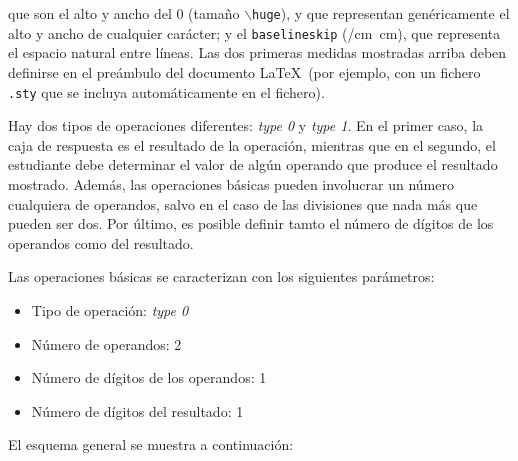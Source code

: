 \documentclass[svgnames,addpoints]{exam}
\makeatletter
\def\convertto#1#2{\strip@pt\dimexpr #2*65536/\number\dimexpr 1#1}
\makeatother
\begin{document}
\noindent
que son el alto y ancho del {\huge 0} (tamaño \texttt{$\backslash$huge}), y que
representan genéricamente el alto y ancho de cualquier carácter; y el
\texttt{baselineskip} (\convertto{cm}{\the\baselineskip}\ cm), que representa el
espacio natural entre líneas. Las dos primeras medidas mostradas arriba deben
definirse en el preámbulo del documento \LaTeX\ (por ejemplo, con un fichero
\texttt{.sty} que se incluya automáticamente en el fichero).

Hay dos tipos de operaciones diferentes: \textit{type 0} y \textit{type 1}. En
el primer caso, la caja de respuesta es el resultado de la operación, mientras
que en el segundo, el estudiante debe determinar el valor de algún operando que
produce el resultado mostrado. Además, las operaciones básicas pueden involucrar
un número cualquiera de operandos, salvo en el caso de las divisiones que nada
más que pueden ser dos. Por último, es posible definir tamto el número de
dígitos de los operandos como del resultado.

Las operaciones básicas se caracterizan con los siguientes parámetros:

\begin{itemize}

  \item Tipo de operación: \textit{type 0}

  \item Número de operandos: 2

  \item Número de dígitos de los operandos: 1

  \item Número de dígitos del resultado: 1

\end{itemize}

El esquema general se muestra a continuación:
\end{document}
